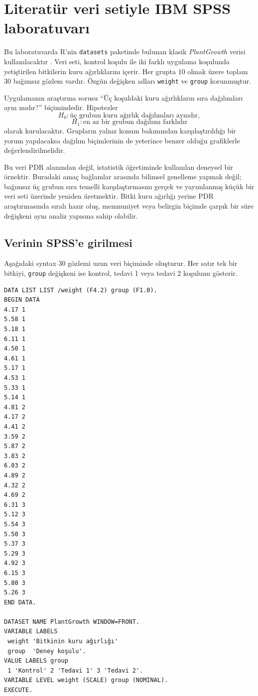 \section{Literatür veri setiyle IBM SPSS laboratuvarı}

Bu laboratuvarda R'nin \texttt{datasets} paketinde bulunan klasik
\emph{PlantGrowth} verisi kullanılacaktır \cite{dobson1983}. Veri seti,
kontrol koşulu ile iki farklı uygulama koşulunda yetiştirilen bitkilerin kuru
ağırlıklarını içerir. Her grupta 10 olmak üzere toplam 30 bağımsız gözlem
vardır. Özgün değişken adları \texttt{weight} ve \texttt{group} korunmuştur.

Uygulamanın araştırma sorusu ``Üç koşuldaki kuru ağırlıkların sıra dağılımları
aynı mıdır?'' biçimindedir. Hipotezler
\[
H_0:\text{üç grubun kuru ağırlık dağılımları aynıdır},
\]
\[
H_1:\text{en az bir grubun dağılımı farklıdır}
\]
olarak kurulacaktır. Grupların yalnız konum bakımından karşılaştırıldığı bir
yorum yapılacaksa dağılım biçimlerinin de yeterince benzer olduğu grafiklerle
değerlendirilmelidir.

\begin{researchbox}
Bu veri PDR alanından değil, istatistik öğretiminde kullanılan deneysel bir
örnektir. Buradaki amaç bağlamlar arasında bilimsel genelleme yapmak değil;
bağımsız üç grubun sıra temelli karşılaştırmasını gerçek ve yayımlanmış küçük
bir veri seti üzerinde yeniden üretmektir. Bitki kuru ağırlığı yerine PDR
araştırmasında sıralı hazır oluş, memnuniyet veya belirgin biçimde çarpık bir
süre değişkeni aynı analiz yapısına sahip olabilir.
\end{researchbox}

\subsection{Verinin SPSS'e girilmesi}

Aşağıdaki syntax 30 gözlemi uzun veri biçiminde oluşturur. Her satır tek bir
bitkiyi, \texttt{group} değişkeni ise kontrol, tedavi 1 veya tedavi 2 koşulunu
gösterir.

\begin{lstlisting}[language={}]
DATA LIST LIST /weight (F4.2) group (F1.0).
BEGIN DATA
4.17 1
5.58 1
5.18 1
6.11 1
4.50 1
4.61 1
5.17 1
4.53 1
5.33 1
5.14 1
4.81 2
4.17 2
4.41 2
3.59 2
5.87 2
3.83 2
6.03 2
4.89 2
4.32 2
4.69 2
6.31 3
5.12 3
5.54 3
5.50 3
5.37 3
5.29 3
4.92 3
6.15 3
5.80 3
5.26 3
END DATA.

DATASET NAME PlantGrowth WINDOW=FRONT.
VARIABLE LABELS
 weight 'Bitkinin kuru ağırlığı'
 group  'Deney koşulu'.
VALUE LABELS group
 1 'Kontrol' 2 'Tedavi 1' 3 'Tedavi 2'.
VARIABLE LEVEL weight (SCALE) group (NOMINAL).
EXECUTE.
\end{lstlisting}

